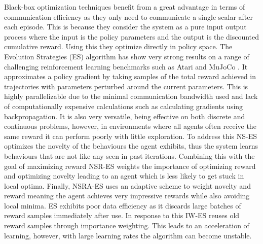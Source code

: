 Black-box optimization techniques benefit from a great advantage in terms of communication efficiency as they only need to communicate a single scalar after each episode. This is because they consider the system as a pure input output process where the input is the policy parameters and the output is the discounted cumulative reward. Using this they optimize directly in policy space.
The Evolution Strategies (ES) \cite{ES} algorithm has show very strong results on a range of challenging reinforcement learning benchmarks such as Atari \cite{Atari} and MuJoCo \cite{MuJoCo}. It approximates a policy gradient by taking samples of the total reward achieved in trajectories with parameters perturbed around the current parameters. This is highly parallelizable due to the minimal communication bandwidth used and lack of computationally expensive calculations such as calculating gradients using backpropagation. It is also very versatile, being effective on both discrete and continuous problems, however, in environments where all agents often receive the same reward it can perform poorly with little exploration. 
To address this NS-ES \cite{NS-ES} optimizes the novelty of the behaviours the agent exhibits, thus the system learns behaviours that are not like any seen in past iterations. Combining this with the goal of maximizing reward NSR-ES weights the importance of optimizing reward and optimizing novelty leading to an agent which is less likely to get stuck in local optima. Finally, NSRA-ES uses an adaptive scheme to weight novelty and reward meaning the agent achieves very impressive rewards while also avoiding local minima.
ES exhibits poor data efficiency as it discards large batches of reward samples immediately after use. In response to this IW-ES \cite{IWES} reuses old reward samples through importance weighting. This leads to an acceleration of learning, however, with large learning rates the algorithm can become unstable.



